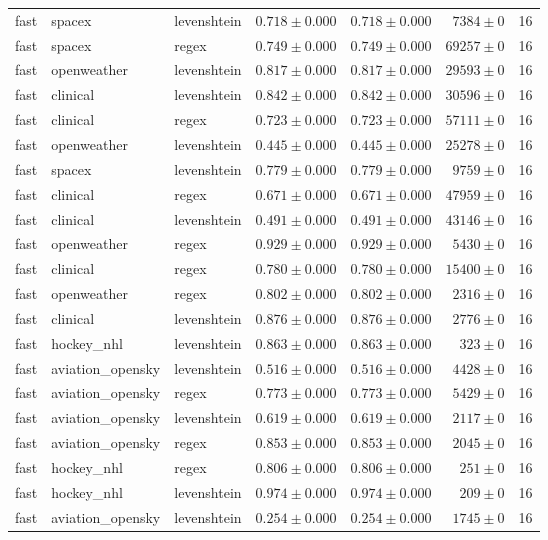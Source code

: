 \begin{table}[htbp]
\begin{tabular}{l l l r r r r}
fast & spacex & levenshtein & $0.718\pm0.000$ & $0.718\pm0.000$ & $7384\pm0$ & 16 \\
fast & spacex & regex & $0.749\pm0.000$ & $0.749\pm0.000$ & $69257\pm0$ & 16 \\
fast & openweather & levenshtein & $0.817\pm0.000$ & $0.817\pm0.000$ & $29593\pm0$ & 16 \\
fast & clinical & levenshtein & $0.842\pm0.000$ & $0.842\pm0.000$ & $30596\pm0$ & 16 \\
fast & clinical & regex & $0.723\pm0.000$ & $0.723\pm0.000$ & $57111\pm0$ & 16 \\
fast & openweather & levenshtein & $0.445\pm0.000$ & $0.445\pm0.000$ & $25278\pm0$ & 16 \\
fast & spacex & levenshtein & $0.779\pm0.000$ & $0.779\pm0.000$ & $9759\pm0$ & 16 \\
fast & clinical & regex & $0.671\pm0.000$ & $0.671\pm0.000$ & $47959\pm0$ & 16 \\
fast & clinical & levenshtein & $0.491\pm0.000$ & $0.491\pm0.000$ & $43146\pm0$ & 16 \\
fast & openweather & regex & $0.929\pm0.000$ & $0.929\pm0.000$ & $5430\pm0$ & 16 \\
fast & clinical & regex & $0.780\pm0.000$ & $0.780\pm0.000$ & $15400\pm0$ & 16 \\
fast & openweather & regex & $0.802\pm0.000$ & $0.802\pm0.000$ & $2316\pm0$ & 16 \\
fast & clinical & levenshtein & $0.876\pm0.000$ & $0.876\pm0.000$ & $2776\pm0$ & 16 \\
fast & hockey\_nhl & levenshtein & $0.863\pm0.000$ & $0.863\pm0.000$ & $323\pm0$ & 16 \\
fast & aviation\_opensky & levenshtein & $0.516\pm0.000$ & $0.516\pm0.000$ & $4428\pm0$ & 16 \\
fast & aviation\_opensky & regex & $0.773\pm0.000$ & $0.773\pm0.000$ & $5429\pm0$ & 16 \\
fast & aviation\_opensky & levenshtein & $0.619\pm0.000$ & $0.619\pm0.000$ & $2117\pm0$ & 16 \\
fast & aviation\_opensky & regex & $0.853\pm0.000$ & $0.853\pm0.000$ & $2045\pm0$ & 16 \\
fast & hockey\_nhl & regex & $0.806\pm0.000$ & $0.806\pm0.000$ & $251\pm0$ & 16 \\
fast & hockey\_nhl & levenshtein & $0.974\pm0.000$ & $0.974\pm0.000$ & $209\pm0$ & 16 \\
fast & aviation\_opensky & levenshtein & $0.254\pm0.000$ & $0.254\pm0.000$ & $1745\pm0$ & 16 \\

\end{tabular}
\end{table}
